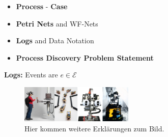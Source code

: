 \documentclass[a4paper]{IEEEtran}
\begin{document}
\begin{itemize}

    \item \textbf{Process} -  \textbf{Case}
    \item \textbf{Petri Nets} and WF-Nets 
    \item \textbf{Logs} and Data Notation
    \item \textbf{Process Discovery Problem Statement}
\end{itemize}
\textbf{Logs:} Events are $e \in \mathcal{E}$
\begin{figure}[!h]
    \centering
    \includegraphics[width=0.48\textwidth]{Bild.png}
    \caption{Hier kommen weitere Erklärungen zum Bild.}
    \label{fig:bild}
\end{figure}




\end{document}
